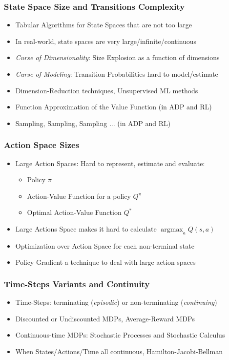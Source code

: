 \documentclass[handout]{beamer}
\DeclareMathOperator*{\argmax}{argmax}
\begin{document}
\begin{frame}
\frametitle{State Space Size and Transitions Complexity}
\pause
\begin{itemize}[<+->]
\item Tabular Algorithms for State Spaces that are not too large
\item In real-world, state spaces are very large/infinite/continuous
\item {\em Curse of Dimensionality}: Size Explosion as a function of dimensions
\item {\em Curse of Modeling}: Transition Probabilities hard to model/estimate
\item Dimension-Reduction techniques, Unsupervised ML methods
\item Function Approximation of the Value Function (in ADP and RL)
\item Sampling, Sampling, Sampling ... (in ADP and RL)
\end{itemize}
\end{frame}

\begin{frame}
\frametitle{Action Space Sizes}
\pause
\begin{itemize}[<+->]
\item Large Action Spaces: Hard to represent, estimate and evaluate:
\begin{itemize}
\item Policy $\pi$
\item Action-Value Function for a policy $Q^{\pi}$
\item Optimal Action-Value Function $Q^*$
\end{itemize}
\item Large Actions Space makes it hard to calculate $\argmax_a Q(s,a)$
\item Optimization over Action Space for each non-terminal state
\item Policy Gradient a technique to deal with large action spaces
\end{itemize}
\end{frame}

\begin{frame}
\frametitle{Time-Steps Variants and Continuity}
\pause
\begin{itemize}[<+->]
\item Time-Steps: terminating ({\em episodic}) or non-terminating ({\em continuing})
\item Discounted or Undiscounted MDPs, Average-Reward MDPs
\item Continuous-time MDPs: Stochastic Processes and Stochastic Calculus
\item When States/Actions/Time all continuous, Hamilton-Jacobi-Bellman
\end{itemize}
\end{frame}
\end{document}
